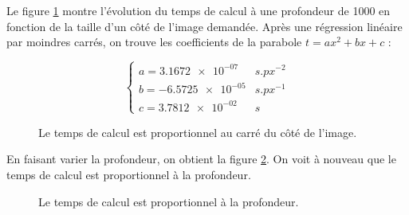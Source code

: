 Le figure \ref{fig:mandel-seq-taille} montre l'évolution du temps de
calcul à une profondeur de 1000 en fonction de la taille d'un côté de
l'image demandée. Après une régression linéaire par moindres carrés,
on trouve les coefficients de la parabole $t = a x^2 + b x + c$ :

\[ \begin{cases}
    a = \num{3.1672e-07}  & s.px^{-2}\\
    b = \num{-6.5725e-05} & s.px^{-1}\\
    c = \num{3.7812e-02}  & s\end{cases} \]


\begin{figure}[t]
  \centering


  \caption{Le temps de calcul est proportionnel au carré du côté de l'image.}
  \label{fig:mandel-seq-taille}
\end{figure}

En faisant varier la profondeur, on obtient la figure
\ref{fig:mandel-seq-prof}. On voit à nouveau que le temps de calcul
est proportionnel à la profondeur.

\begin{figure}
  \centering
  \caption{Le temps de calcul est proportionnel à la profondeur.}
  \label{fig:mandel-seq-prof}
\end{figure}

